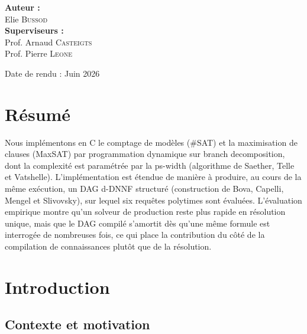 \documentclass[11pt,a4paper]{report}
\theoremstyle{plain}
\theoremstyle{definition}
\begin{document}
\begin{titlepage}
    \begin{flushleft} \large
        \textbf{Auteur :}\\
        Elie \textsc{Bussod} \\[1cm]
        \textbf{Superviseurs :} \\
        Prof. Arnaud \textsc{Casteigts} \\
        Prof. Pierre \textsc{Leone}
    \end{flushleft}
    
    \vfill
    \begin{center}
        {\large Date de rendu : Juin 2026}
    \end{center}
\end{titlepage}



\chapter*{Résumé}

Nous implémentons en C le comptage de modèles (\#SAT) et la
maximisation de clauses (MaxSAT) par programmation dynamique sur
branch decomposition, dont la complexité est paramétrée par la
ps-width (algorithme de Saether, Telle et Vatshelle). L'implémentation
est étendue de manière à produire, au cours de la même exécution, un
DAG d-DNNF structuré (construction de Bova, Capelli, Mengel et
Slivovsky), sur lequel six requêtes polytimes sont évaluées.
L'évaluation empirique montre qu'un solveur de production reste plus
rapide en résolution unique, mais que le DAG compilé s'amortit dès
qu'une même formule est interrogée de nombreuses fois, ce qui place la
contribution du côté de la compilation de connaissances plutôt que de
la résolution.

\clearpage

\tableofcontents
\clearpage

\listoffigures
\clearpage


\chapter{Introduction}
\label{chap:intro}

\section{Contexte et motivation}
\end{document}
